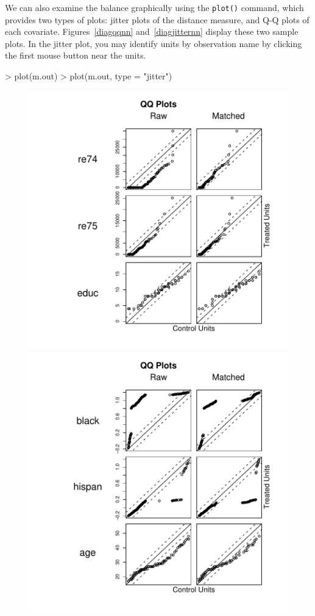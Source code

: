\documentclass[oneside,letterpaper,titlepage]{article}
\begin{document}
\begin{enumerate}
We can also examine the balance graphically using the \texttt{plot()}
command, which provides two types of plots: jitter plots of the
distance measure, and Q-Q plots of each covariate.
Figures~\ref{diagqqnn} and~\ref{diagjitternn} display these two sample
plots.  In the jitter plot, you may identify units by observation name
by clicking the first mouse button near the units.
\begin{Schunk}
\begin{Sinput}
> plot(m.out)
> plot(m.out, type = "jitter")
\end{Sinput}
\end{Schunk}

\begin{figure}[tbp]
  \begin{center}
    \includegraphics[scale=0.25]{figs/qqplotnn}
    \includegraphics[scale=0.25]{figs/qqplotnn2} 

\end{center}
\end{figure}
\end{enumerate}
\end{document}
